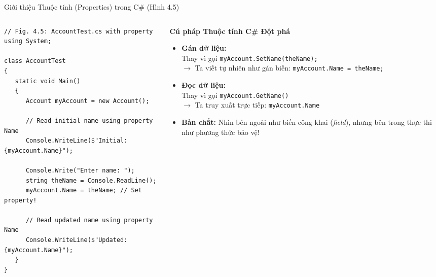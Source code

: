 \documentclass[aspectratio=169, 10pt]{beamer}
\begin{document}
\begin{frame}[fragile]{Giới thiệu Thuộc tính (Properties) trong C\# (Hình 4.5)}
  \begin{columns}[T]
    \begin{column}{0.55\textwidth}
      \begin{tcolorbox}[colback=CodeBg,colframe=UniNavy,title=\textbf{AccountTest.cs dùng Property (Fig. 4.5)},fonttitle=\small\bfseries]
\begin{lstlisting}
// Fig. 4.5: AccountTest.cs with property
using System;

class AccountTest
{
   static void Main()
   {
      Account myAccount = new Account();

      // Read initial name using property Name
      Console.WriteLine($"Initial: {myAccount.Name}");

      Console.Write("Enter name: ");
      string theName = Console.ReadLine();
      myAccount.Name = theName; // Set property!

      // Read updated name using property Name
      Console.WriteLine($"Updated: {myAccount.Name}");
   }
}
\end{lstlisting}
      \end{tcolorbox}
    \end{column}

    \begin{column}{0.43\textwidth}
      \begin{exampleblock}{\textbf{Cú pháp Thuộc tính C\# Đột phá}}
        \begin{itemize}\small
          \item \textbf{Gán dữ liệu:}\\
          Thay vì gọi \texttt{myAccount.SetName(theName);}\\
          $\to$ Ta viết tự nhiên như gán biến:
          \texttt{myAccount.Name = theName;}
          \item \textbf{Đọc dữ liệu:}\\
          Thay vì gọi \texttt{myAccount.GetName()}\\
          $\to$ Ta truy xuất trực tiếp:
          \texttt{myAccount.Name}
          \item \textbf{Bản chất:} Nhìn bên ngoài như biến công khai (\textit{field}), nhưng bên trong thực thi như phương thức bảo vệ!
        \end{itemize}
      \end{exampleblock}
    \end{column}
  \end{columns}
\end{frame}
\end{document}
